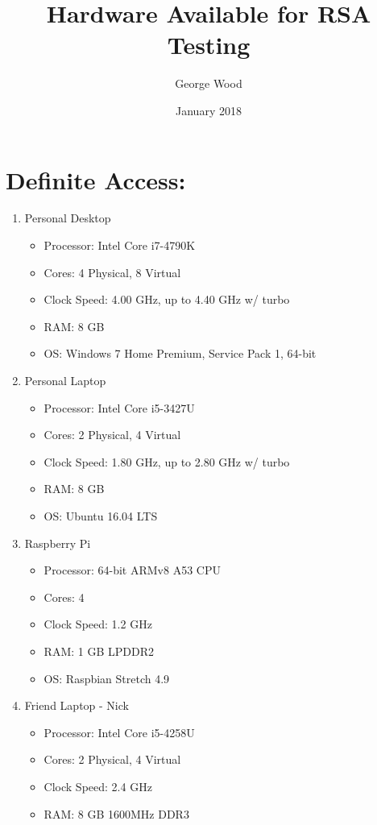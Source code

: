 \documentclass[11pt]{article}
\title{Hardware Available for RSA Testing}
\author{George Wood}
\date{January 2018}
\begin{document}
\maketitle

\thispagestyle{empty}

\section{Definite Access:}

\begin{enumerate}
\item{Personal Desktop
	\begin{itemize}
	\item{Processor: Intel Core i7-4790K}
	\item{Cores: 4 Physical, 8 Virtual}
	\item{Clock Speed: 4.00 GHz, up to 4.40 GHz w/ turbo}
	\item{RAM: 8 GB}
	\item{OS: Windows 7 Home Premium, Service Pack 1, 64-bit}
	\end{itemize}
	}
\item{Personal Laptop
	\begin{itemize}
	\item{Processor: Intel Core i5-3427U}
	\item{Cores: 2 Physical, 4 Virtual}
	\item{Clock Speed: 1.80 GHz, up to 2.80 GHz w/ turbo}
	\item{RAM: 8 GB}
	\item{OS: Ubuntu 16.04 LTS}
	\end{itemize}
	}
\item{Raspberry Pi
	\begin{itemize}
	\item{Processor: 64-bit ARMv8 A53 CPU}
	\item{Cores: 4}
	\item{Clock Speed: 1.2 GHz}
	\item{RAM: 1 GB LPDDR2}
	\item{OS: Raspbian Stretch 4.9}
	\end{itemize}
	}
\item{Friend Laptop - Nick
	\begin{itemize}
	\item{Processor: Intel Core i5-4258U}
	\item{Cores: 2 Physical, 4 Virtual}
	\item{Clock Speed: 2.4 GHz}
	\item{RAM: 8 GB 1600MHz DDR3}

\end{itemize}}
\end{enumerate}
\end{document}

